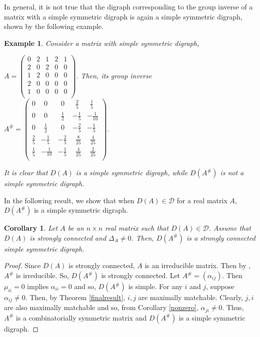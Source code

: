 \documentclass[notitlepage,12pt,reqno]{amsart}
\newtheorem{cor}[thm]{Corollary}
\newtheorem{ex}[thm]{Example}
\numberwithin{equation}{section}
\begin{document}
In general, it is not true that the digraph corresponding to the group inverse of a matrix with a simple symmetric digraph is again a simple symmetric digraph, shown by the following example.
\begin{ex}\label{ssd}
Consider a matrix with simple symmetric digraph, 
\begin{center}
$A=\begin{pmatrix}
0 & 2 & 1 & 2 & 1\\
2 & 0 & 2 & 0 & 0\\
1 & 2 & 0 & 0 & 0\\
2 & 0 & 0 & 0 & 0\\
1 & 0 & 0 & 0 & 0\\
\end{pmatrix}$. Then, its group inverse
$A^{\#}=\begin{pmatrix}
0 & \ \ 0 & \ \ 0 & \ \ \frac{2}{5} & \ \ \frac{1}{5}\\
0 & \ \ 0 & \ \ \frac{1}{2} & -\frac{1}{5} & -\frac{1}{10}\\
0 & \ \ \frac{1}{2} & \ \ 0 & -\frac{2}{5} & -\frac{1}{5}\\
\frac{2}{5} & -\frac{1}{5} & -\frac{2}{5} & \ \ \frac{8}{25} & \ \ \frac{4}{25}\\
\frac{1}{5} & -\frac{1}{10} & -\frac{1}{5} & \ \ \frac{4}{25} & \ \ \frac{2}{25}\\
\end{pmatrix}$.
\end{center}
It is clear that $D(A)$ is a simple symmetric digraph, while $D(A^{\#})$ is not a simple symmetric digraph.
\end{ex}
In the following result, we show that when $D(A)\in \mathcal{D}$ for a real matrix $A$, $D(A^{\#})$ is a simple symmetric digraph.
\begin{cor}\label{ssd2}
Let $A$ be an $n\times n$ real matrix such that $D(A)\in \mathcal{D}$. Assume that $D(A)$ is strongly connected and $\Delta _A\neq 0$. Then, $D(A^{\#})$ is a strongly connected simple symmetric digraph.
\end{cor}
\begin{proof}
Since $D(A)$ is strongly connected, $A$ is an irreducible matrix. Then by \cite[Lemma 2.4]{kls}, $A^{\#}$ is irreducible. So, $D(A^{\#})$ is strongly connected. Let $A^{\#}=(\alpha _{ij})$. Then $\mu _{ii}=0$ implies $\alpha _{ii}=0$ and so, $D(A^{\#})$ is simple. For any $i$ and $j$, suppose $\alpha _{ij}\neq 0$. Then, by Theorem \ref{finalresult}, $i,j$ are maximally matchable. Clearly, $j,i$ are also maximally matchable and so, from Corollary \ref{nonzero}, $\alpha _{ji}\neq 0$. Thus, $A^{\#}$ is a combinatorially symmetric matrix and $D(A^{\#})$ is a simple symmetric digraph.
\end{proof}
\end{document}
